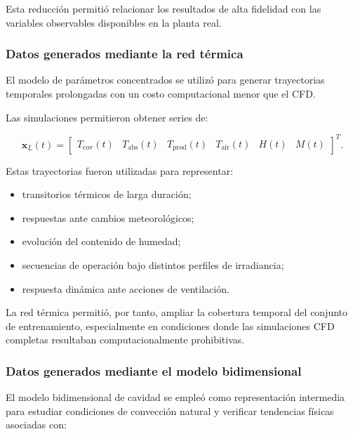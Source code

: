 Esta reducción permitió relacionar los resultados de alta fidelidad con las variables observables disponibles en la planta real.

\subsubsection{Datos generados mediante la red térmica}

El modelo de parámetros concentrados se utilizó para generar trayectorias temporales prolongadas con un costo computacional menor que el CFD.

Las simulaciones permitieron obtener series de:

\begin{equation}
\mathbf{x}_{L}(t)
=
\begin{bmatrix}
T_{\mathrm{cov}}(t) &
T_{\mathrm{abs}}(t) &
T_{\mathrm{prod}}(t) &
T_{\mathrm{air}}(t) &
H(t) &
M(t)
\end{bmatrix}^{T}.
\label{eq:estados_lumped_sinteticos}
\end{equation}

Estas trayectorias fueron utilizadas para representar:

\begin{itemize}
    \item transitorios térmicos de larga duración;
    \item respuestas ante cambios meteorológicos;
    \item evolución del contenido de humedad;
    \item secuencias de operación bajo distintos perfiles de irradiancia;
    \item respuesta dinámica ante acciones de ventilación.
\end{itemize}

La red térmica permitió, por tanto, ampliar la cobertura temporal del conjunto de entrenamiento, especialmente en condiciones donde las simulaciones CFD completas resultaban computacionalmente prohibitivas.

\subsubsection{Datos generados mediante el modelo bidimensional}

El modelo bidimensional de cavidad se empleó como representación intermedia para estudiar condiciones de convección natural y verificar tendencias físicas asociadas con:

